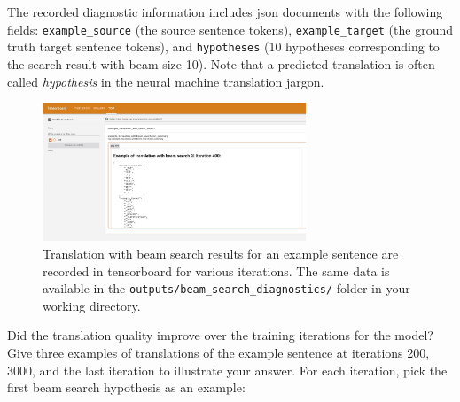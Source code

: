 \begin{parts}
    The recorded diagnostic information includes json documents with the following fields: \texttt{example\_source} (the source sentence tokens), \texttt{example\_target} (the ground truth target sentence tokens), and \texttt{hypotheses} (10 hypotheses corresponding to the search result with beam size 10). Note that a predicted translation is often called \emph{hypothesis} in the neural machine translation jargon.
    \newpage
    \begin{figure}
        \centering
        \includegraphics[width=0.7\textwidth]{images/example_translation_beam.jpg}
        \caption{Translation with beam search results for an example sentence are recorded in tensorboard for various iterations. The same data is available in the \texttt{outputs/beam\_search\_diagnostics/} folder in your working directory.}
        \label{fig:beam-search-diagnostics-tensorboard}
    \end{figure}

    \begin{subparts}
        \subpart[2] Did the translation quality improve over the training iterations for the model? Give three examples of translations of the example sentence at iterations 200, 3000, and the last iteration to illustrate your answer. For each iteration, pick the first beam search hypothesis as an example:
        

\end{subparts}
\end{parts}
